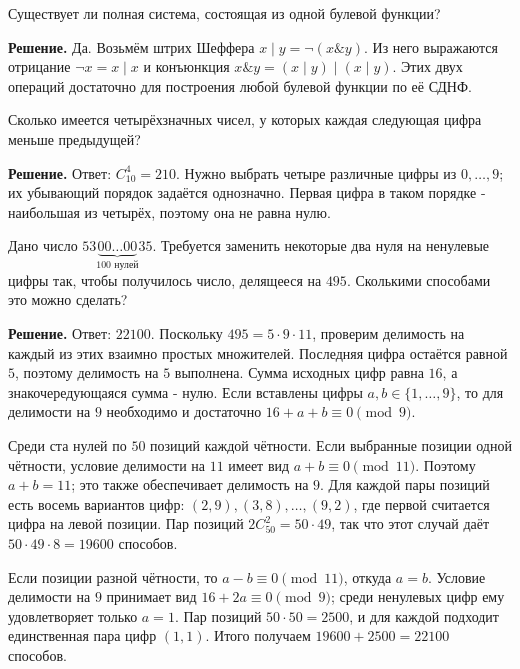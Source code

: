 \begin{problems}
\item Существует ли полная система, состоящая из одной булевой функции?
\par\smallskip\noindent\textbf{Решение.} Да. Возьмём штрих Шеффера $x\mid y=\neg(x\mathbin{\&}y)$. Из него выражаются отрицание $\neg x=x\mid x$ и конъюнкция $x\mathbin{\&}y=(x\mid y)\mid(x\mid y)$. Этих двух операций достаточно для построения любой булевой функции по её СДНФ.\par

\item Сколько имеется четырёхзначных чисел, у которых каждая следующая цифра меньше предыдущей?
\par\smallskip\noindent\textbf{Решение.} Ответ: $C_{10}^{4}=210$. Нужно выбрать четыре различные цифры из $0,\ldots,9$; их убывающий порядок задаётся однозначно. Первая цифра в таком порядке - наибольшая из четырёх, поэтому она не равна нулю.\par

\item Дано число $53\underbrace{00\ldots00}_{100\text{ нулей}}35$. Требуется заменить некоторые два нуля на ненулевые цифры так, чтобы получилось число, делящееся на $495$. Сколькими способами это можно сделать?
\par\smallskip\noindent\textbf{Решение.} Ответ: $22100$. Поскольку $495=5\cdot9\cdot11$, проверим делимость на каждый из этих взаимно простых множителей. Последняя цифра остаётся равной $5$, поэтому делимость на $5$ выполнена. Сумма исходных цифр равна $16$, а знакочередующаяся сумма - нулю. Если вставлены цифры $a,b\in\{1,\ldots,9\}$, то для делимости на $9$ необходимо и достаточно $16+a+b\equiv0\pmod9$.
\par Среди ста нулей по $50$ позиций каждой чётности. Если выбранные позиции одной чётности, условие делимости на $11$ имеет вид $a+b\equiv0\pmod{11}$. Поэтому $a+b=11$; это также обеспечивает делимость на $9$. Для каждой пары позиций есть восемь вариантов цифр: $(2,9),(3,8),\ldots,(9,2)$, где первой считается цифра на левой позиции. Пар позиций $2C_{50}^{2}=50\cdot49$, так что этот случай даёт $50\cdot49\cdot8=19600$ способов.
\par Если позиции разной чётности, то $a-b\equiv0\pmod{11}$, откуда $a=b$. Условие делимости на $9$ принимает вид $16+2a\equiv0\pmod9$; среди ненулевых цифр ему удовлетворяет только $a=1$. Пар позиций $50\cdot50=2500$, и для каждой подходит единственная пара цифр $(1,1)$. Итого получаем $19600+2500=22100$ способов.\par


\end{problems}

